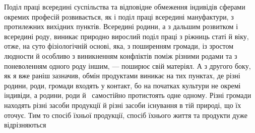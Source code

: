 Поділ праці всередині суспільства та відповідне обмеження
індивідів сферами окремих професій розвивається, як і поділ
праці всередині мануфактури, з протилежних вихідних пунктів.
Всередині родини, а з дальшим розвитком і всередині роду,
виникає природно вирослий поділ праці з ріжниць статі й віку,
отже, на суто фізіологічній основі, яка, з поширенням громади,
із зростом людности й особливо з виникненням конфліктів поміж
різними родами та з поневоленням одного роду іншим, — поширює
свій матеріял. А з другого боку, як я вже раніш зазначив,
обмін продуктами виникає на тих пунктах, де різні родини,
роди, громади входять у контакт, бо на початках культури не
окремі індивіди, а родини, роди й~ самостійно протистоять одне
одному. Різні громади находять різні засоби продукції й різні
засоби існування в тій природі, що їх оточує. Тим то спосіб їхньої
продукції, спосіб їхнього життя та продукти дуже відрізняються
\parbreak{}  %
